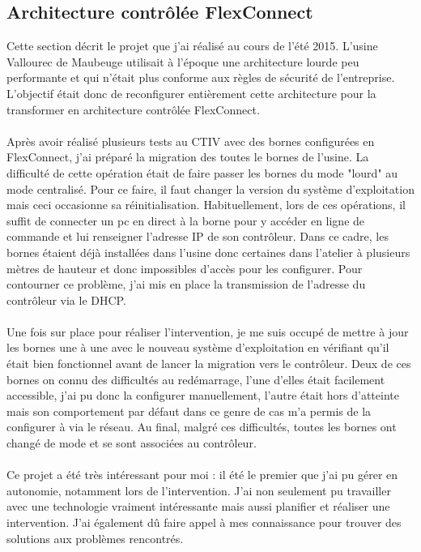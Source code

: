 \documentclass[a4paper,12pt]{report}
\begin{document}
\subsection{Architecture contrôlée FlexConnect}
Cette section décrit le projet que j'ai réalisé au cours de l'été 2015. L'usine Vallourec de Maubeuge utilisait à l'époque une architecture lourde peu performante et qui n'était plus conforme aux règles de sécurité de l'entreprise. L'objectif était donc de reconfigurer entièrement cette architecture pour la transformer en architecture contrôlée FlexConnect.
\paragraph{}
Après avoir réalisé plusieurs tests au CTIV avec des bornes configurées en FlexConnect, j'ai préparé la migration des toutes le bornes de l'usine. La difficulté de cette opération était de faire passer les bornes du mode "lourd" au mode centralisé. Pour ce faire, il faut changer la version du système d'exploitation mais ceci occasionne sa réinitialisation. Habituellement, lors de ces opérations, il suffit de connecter un pc en direct à la borne pour y accéder en ligne de commande et lui renseigner l'adresse IP de son contrôleur. Dans ce cadre, les bornes étaient déjà installées dans l'usine donc certaines dans l'atelier à plusieurs mètres de hauteur et donc impossibles d'accès pour les configurer. Pour contourner ce problème, j'ai mis en place la transmission de l'adresse du contrôleur via le DHCP.
\paragraph{}
Une fois sur place pour réaliser l'intervention, je me suis occupé de mettre à jour les bornes une à une avec le nouveau système d'exploitation en vérifiant qu'il était bien fonctionnel avant de lancer la migration vers le contrôleur. Deux de ces bornes on connu des difficultés au redémarrage, l'une d'elles était facilement accessible, j'ai pu donc la configurer manuellement, l'autre était hors d'atteinte mais son comportement par défaut dans ce genre de cas m'a permis de la configurer à via le réseau. Au final, malgré ces difficultés, toutes les bornes ont changé de mode et se sont associées au contrôleur.
\paragraph{}
Ce projet a été très intéressant pour moi : il été le premier que j'ai pu gérer en autonomie, notamment lors de  l'intervention. J'ai non seulement pu travailler avec une technologie vraiment intéressante mais aussi planifier et réaliser une intervention. J'ai également dû faire appel à mes connaissance pour trouver des solutions aux problèmes rencontrés.
\end{document}
